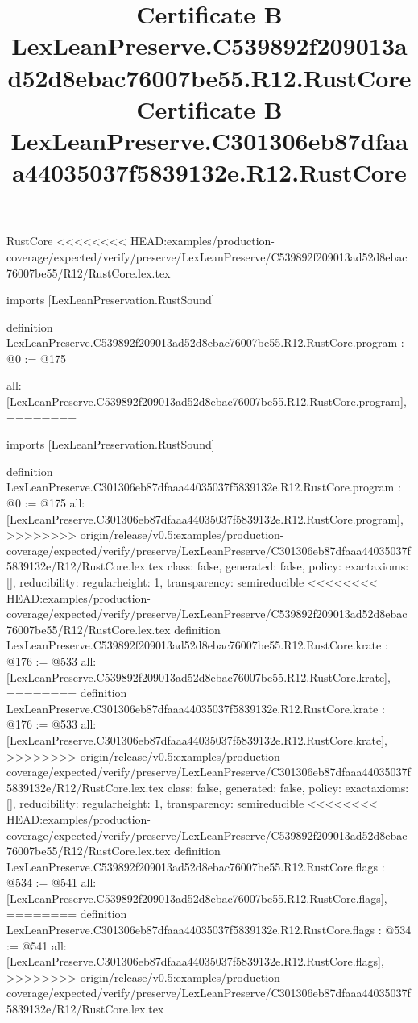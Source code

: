 \begin{lexlean}{RustCore}
<<<<<<<< HEAD:examples/production-coverage/expected/verify/preserve/LexLeanPreserve/C539892f209013ad52d8ebac76007be55/R12/RustCore.lex.tex
\title{Certificate B LexLeanPreserve.C539892f209013ad52d8ebac76007be55.R12.RustCore}
\begin{coremodule}
imports [LexLeanPreservation.RustSound]

definition LexLeanPreserve.C539892f209013ad52d8ebac76007be55.R12.RustCore.program : @0 := @175 {
  all: [LexLeanPreserve.C539892f209013ad52d8ebac76007be55.R12.RustCore.program],
========
\title{Certificate B LexLeanPreserve.C301306eb87dfaaa44035037f5839132e.R12.RustCore}
\begin{coremodule}
imports [LexLeanPreservation.RustSound]

definition LexLeanPreserve.C301306eb87dfaaa44035037f5839132e.R12.RustCore.program : @0 := @175 {
  all: [LexLeanPreserve.C301306eb87dfaaa44035037f5839132e.R12.RustCore.program],
>>>>>>>> origin/release/v0.5:examples/production-coverage/expected/verify/preserve/LexLeanPreserve/C301306eb87dfaaa44035037f5839132e/R12/RustCore.lex.tex
  class: false,
  generated: false,
  policy: exact{axioms: []},
  reducibility: regular{height: 1},
  transparency: semireducible
}
<<<<<<<< HEAD:examples/production-coverage/expected/verify/preserve/LexLeanPreserve/C539892f209013ad52d8ebac76007be55/R12/RustCore.lex.tex
definition LexLeanPreserve.C539892f209013ad52d8ebac76007be55.R12.RustCore.krate : @176 := @533 {
  all: [LexLeanPreserve.C539892f209013ad52d8ebac76007be55.R12.RustCore.krate],
========
definition LexLeanPreserve.C301306eb87dfaaa44035037f5839132e.R12.RustCore.krate : @176 := @533 {
  all: [LexLeanPreserve.C301306eb87dfaaa44035037f5839132e.R12.RustCore.krate],
>>>>>>>> origin/release/v0.5:examples/production-coverage/expected/verify/preserve/LexLeanPreserve/C301306eb87dfaaa44035037f5839132e/R12/RustCore.lex.tex
  class: false,
  generated: false,
  policy: exact{axioms: []},
  reducibility: regular{height: 1},
  transparency: semireducible
}
<<<<<<<< HEAD:examples/production-coverage/expected/verify/preserve/LexLeanPreserve/C539892f209013ad52d8ebac76007be55/R12/RustCore.lex.tex
definition LexLeanPreserve.C539892f209013ad52d8ebac76007be55.R12.RustCore.flags : @534 := @541 {
  all: [LexLeanPreserve.C539892f209013ad52d8ebac76007be55.R12.RustCore.flags],
========
definition LexLeanPreserve.C301306eb87dfaaa44035037f5839132e.R12.RustCore.flags : @534 := @541 {
  all: [LexLeanPreserve.C301306eb87dfaaa44035037f5839132e.R12.RustCore.flags],
>>>>>>>> origin/release/v0.5:examples/production-coverage/expected/verify/preserve/LexLeanPreserve/C301306eb87dfaaa44035037f5839132e/R12/RustCore.lex.tex
}}}
\end{coremodule}}
\end{coremodule}
\end{lexlean}

